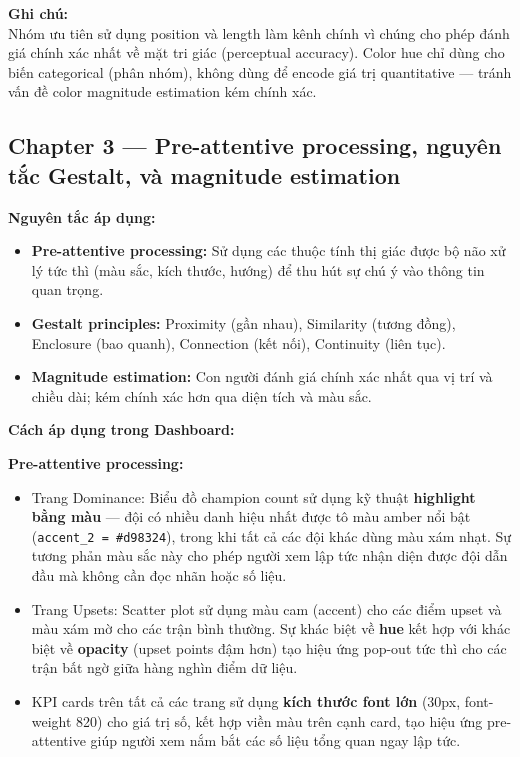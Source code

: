 \documentclass[12pt,a4paper]{article}
\begin{document}
\textbf{Ghi chú:} \\
Nhóm ưu tiên sử dụng position và length làm kênh chính vì chúng cho phép đánh giá chính xác nhất về mặt tri giác (perceptual accuracy). Color hue chỉ dùng cho biến categorical (phân nhóm), không dùng để encode giá trị quantitative --- tránh vấn đề color magnitude estimation kém chính xác.

\subsection{Chapter 3 --- Pre-attentive processing, nguyên tắc Gestalt, và magnitude estimation}
\textbf{Nguyên tắc áp dụng:}
\begin{itemize}
    \item \textbf{Pre-attentive processing:} Sử dụng các thuộc tính thị giác được bộ não xử lý tức thì (màu sắc, kích thước, hướng) để thu hút sự chú ý vào thông tin quan trọng.
    \item \textbf{Gestalt principles:} Proximity (gần nhau), Similarity (tương đồng), Enclosure (bao quanh), Connection (kết nối), Continuity (liên tục).
    \item \textbf{Magnitude estimation:} Con người đánh giá chính xác nhất qua vị trí và chiều dài; kém chính xác hơn qua diện tích và màu sắc.
\end{itemize}

\textbf{Cách áp dụng trong Dashboard:}

\textbf{Pre-attentive processing:}
\begin{itemize}
    \item Trang Dominance: Biểu đồ champion count sử dụng kỹ thuật \textbf{highlight bằng màu} --- đội có nhiều danh hiệu nhất được tô màu amber nổi bật (\texttt{accent\_2 = \#d98324}), trong khi tất cả các đội khác dùng màu xám nhạt. Sự tương phản màu sắc này cho phép người xem lập tức nhận diện được đội dẫn đầu mà không cần đọc nhãn hoặc số liệu.
    \item Trang Upsets: Scatter plot sử dụng màu cam (accent) cho các điểm upset và màu xám mờ cho các trận bình thường. Sự khác biệt về \textbf{hue} kết hợp với khác biệt về \textbf{opacity} (upset points đậm hơn) tạo hiệu ứng pop-out tức thì cho các trận bất ngờ giữa hàng nghìn điểm dữ liệu.
    \item KPI cards trên tất cả các trang sử dụng \textbf{kích thước font lớn} (30px, font-weight 820) cho giá trị số, kết hợp viền màu trên cạnh card, tạo hiệu ứng pre-attentive giúp người xem nắm bắt các số liệu tổng quan ngay lập tức.
\end{itemize}
\end{document}
